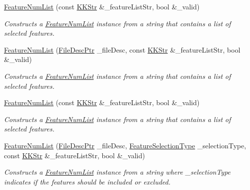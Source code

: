 \begin{DoxyCompactItemize}
\hyperlink{class_k_k_m_l_l_1_1_feature_num_list_a4cef33af9fae647c0c046470f68695fc}{Feature\+Num\+List} (const \hyperlink{class_k_k_b_1_1_k_k_str}{K\+K\+Str} \&\+\_\+feature\+List\+Str, bool \&\+\_\+valid)
\begin{DoxyCompactList}\small\item\em Constructs a \textquotesingle{}\hyperlink{class_k_k_m_l_l_1_1_feature_num_list}{Feature\+Num\+List}\textquotesingle{} instance from a string that contains a list of selected features. \end{DoxyCompactList}\item 
\hyperlink{class_k_k_m_l_l_1_1_feature_num_list_adbd0ff530b10dcb5b84ebe0f61909caf}{Feature\+Num\+List} (\hyperlink{namespace_k_k_m_l_l_aa0d0b6ab4ec18868a399b8455b05d914}{File\+Desc\+Ptr} \+\_\+file\+Desc, const \hyperlink{class_k_k_b_1_1_k_k_str}{K\+K\+Str} \&\+\_\+feature\+List\+Str, bool \&\+\_\+valid)
\begin{DoxyCompactList}\small\item\em Constructs a \textquotesingle{}\hyperlink{class_k_k_m_l_l_1_1_feature_num_list}{Feature\+Num\+List}\textquotesingle{} instance from a string that contains a list of selected features. \end{DoxyCompactList}\item 
\hyperlink{class_k_k_m_l_l_1_1_feature_num_list_ae1f60a0fe29d233fa9dbc7a2844abae4}{Feature\+Num\+List} (const \hyperlink{class_k_k_b_1_1_k_k_str}{K\+K\+Str} \&\+\_\+feature\+List\+Str, bool \&\+\_\+valid)
\begin{DoxyCompactList}\small\item\em Constructs a \textquotesingle{}\hyperlink{class_k_k_m_l_l_1_1_feature_num_list}{Feature\+Num\+List}\textquotesingle{} instance from a string that contains a list of selected features. \end{DoxyCompactList}\item 
\hyperlink{class_k_k_m_l_l_1_1_feature_num_list_a998ae5dc54716e5cd596ebacb56d8369}{Feature\+Num\+List} (\hyperlink{namespace_k_k_m_l_l_aa0d0b6ab4ec18868a399b8455b05d914}{File\+Desc\+Ptr} \+\_\+file\+Desc, \hyperlink{class_k_k_m_l_l_1_1_feature_num_list_a777e270c6cdfd3fb78618db362c718c3}{Feature\+Selection\+Type} \+\_\+selection\+Type, const \hyperlink{class_k_k_b_1_1_k_k_str}{K\+K\+Str} \&\+\_\+feature\+List\+Str, bool \&\+\_\+valid)
\begin{DoxyCompactList}\small\item\em Constructs a \textquotesingle{}\hyperlink{class_k_k_m_l_l_1_1_feature_num_list}{Feature\+Num\+List}\textquotesingle{} instance from a string where \textquotesingle{}\+\_\+selection\+Type\textquotesingle{} indicates if the features should be included or excluded. \end{DoxyCompactList}\item 

\end{DoxyCompactItemize}
